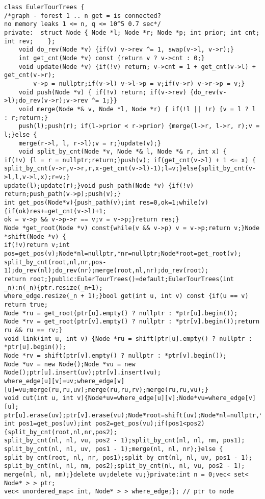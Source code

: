 \documentclass[a4paper,12pt]{article}
\begin{document}
\begin{verbatim}
class EulerTourTrees {
/*graph - forest 1 .. n get = is connected?
no memory leaks 1 <= n, q <= 10^5 0.7 sec*/
private:  struct Node { Node *l; Node *r; Node *p; int prior; int cnt; int rev;    };
    void do_rev(Node *v) {if(v) v->rev ^= 1, swap(v->l, v->r);}
    int get_cnt(Node *v) const {return v ? v->cnt : 0;}
    void update(Node *v) {if(!v) return; v->cnt = 1 + get_cnt(v->l) + get_cnt(v->r);
        v->p = nullptr;if(v->l) v->l->p = v;if(v->r) v->r->p = v;}
    void push(Node *v) { if(!v) return; if(v->rev) {do_rev(v->l);do_rev(v->r);v->rev ^= 1;}}
    void merge(Node *& v, Node *l, Node *r) { if(!l || !r) {v = l ? l : r;return;}
    push(l);push(r); if(l->prior < r->prior) {merge(l->r, l->r, r);v = l;}else {
    merge(r->l, l, r->l);v = r;}update(v);}
    void split_by_cnt(Node *v, Node *& l, Node *& r, int x) {
if(!v) {l = r = nullptr;return;}push(v); if(get_cnt(v->l) + 1 <= x) {
split_by_cnt(v->r,v->r,r,x-get_cnt(v->l)-1);l=v;}else{split_by_cnt(v->l,l,v->l,x);r=v;}
update(l);update(r);}void push_path(Node *v) {if(!v) return;push_path(v->p);push(v);}
int get_pos(Node*v){push_path(v);int res=0,ok=1;while(v){if(ok)res+=get_cnt(v->l)+1;
ok = v->p && v->p->r == v;v = v->p;}return res;}
Node *get_root(Node *v) const{while(v && v->p) v = v->p;return v;}Node *shift(Node *v) {
if(!v)return v;int pos=get_pos(v);Node*nl=nullptr,*nr=nullptr;Node*root=get_root(v);
split_by_cnt(root,nl,nr,pos-1);do_rev(nl);do_rev(nr);merge(root,nl,nr);do_rev(root);
return root;}public:EulerTourTrees()=default;EulerTourTrees(int _n):n(_n){ptr.resize(_n+1);
where_edge.resize(_n + 1);}bool get(int u, int v) const {if(u == v) return true;
Node *ru = get_root(ptr[u].empty() ? nullptr : *ptr[u].begin());
Node *rv = get_root(ptr[v].empty() ? nullptr : *ptr[v].begin());return ru && ru == rv;}
void link(int u, int v) {Node *ru = shift(ptr[u].empty() ? nullptr : *ptr[u].begin());
Node *rv = shift(ptr[v].empty() ? nullptr : *ptr[v].begin());
Node *uv = new Node();Node *vu = new Node();ptr[u].insert(uv);ptr[v].insert(vu);
where_edge[u][v]=uv;where_edge[v][u]=vu;merge(ru,ru,uv);merge(ru,ru,rv);merge(ru,ru,vu);}
void cut(int u, int v){Node*uv=where_edge[u][v];Node*vu=where_edge[v][u];
ptr[u].erase(uv);ptr[v].erase(vu);Node*root=shift(uv);Node*nl=nullptr,*nm=nullptr,*nr=nullptr;
int pos1=get_pos(uv);int pos2=get_pos(vu);if(pos1<pos2){split_by_cnt(root,nl,nr,pos2);
split_by_cnt(nl, nl, vu, pos2 - 1);split_by_cnt(nl, nl, nm, pos1);
split_by_cnt(nl, nl, uv, pos1 - 1);merge(nl, nl, nr);}else {
split_by_cnt(root, nl, nr, pos1);split_by_cnt(nl, nl, uv, pos1 - 1);
split_by_cnt(nl, nl, nm, pos2);split_by_cnt(nl, nl, vu, pos2 - 1);
merge(nl, nl, nm);}delete uv;delete vu;}private:int n = 0;vec< set< Node* > > ptr;
vec< unordered_map< int, Node* > > where_edge;}; // ptr to node
\end{verbatim}
\end{document}
